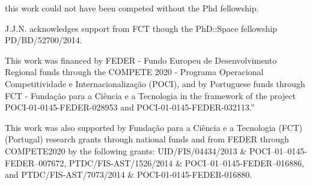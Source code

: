 \begin{acknowledgements}

this work could not have been competed without the Phd fellowship.

J.J.N. acknowledges support from FCT though the PhD::Space fellowship PD/BD/52700/2014.

This work was financed by FEDER - Fundo Europeu de Desenvolvimento Regional funds through the COMPETE 2020 - Programa Operacional Competitividade e Internacionalização (POCI), and by Portuguese funds through FCT - Fundação para a Ciência e a Tecnologia in the framework of the project POCI-01-0145-FEDER-028953 and POCI-01-0145-FEDER-032113.''

This work was also supported by Funda\c{c}\~ao para a Ci\^encia e a Tecnologia (FCT) (Portugal) research grants through national funds and from FEDER through COMPETE2020 by the following grants: UID/FIS/04434/2013 \& POCI--01--0145-FEDER--007672, PTDC/FIS-AST/1526/2014 \& POCI--01--0145-FEDER--016886, and PTDC/FIS-AST/7073/2014 \& POCI-01-0145-FEDER-016880.


\end{acknowledgements}
